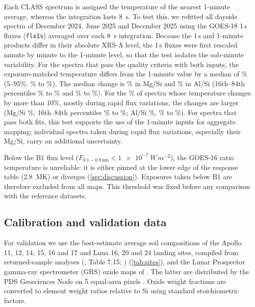 Each CLASS spectrum is assigned the temperature of the nearest 1-minute average, whereas the integration lasts \SI{8}{s}. To test this, we refitted all dayside spectra of December 2024, June 2025 and December 2025 using the GOES-18 1\,s fluxes (\texttt{flx1s}) averaged over each \SI{8}{s} integration. Because the 1\,s and 1-minute products differ in their absolute XRS-A level, the 1\,s fluxes were first rescaled minute by minute to the 1-minute level, so that the test isolates the sub-minute variability. For the \GosN{} spectra that pass the quality criteria with both inputs, the exposure-matched temperature differs from the 1-minute value by a median of \GosTMed\% (5--95\%: \GosTLo\% to \GosTHi\%). The median change is \GosMgMed\% in Mg/Si and \GosAlMed\% in Al/Si (16th--84th percentiles \GosMgLo\% to \GosMgHi\% and \GosAlLo\% to \GosAlHi\%). For the \GosBigPct\% of spectra whose temperature changes by more than 10\%, mostly during rapid flux variations, the changes are larger (Mg/Si \GosMgBigMed\%, 16th--84th percentiles \GosMgBigLo\% to \GosMgBigHi\%; Al/Si \GosAlBigMed\%, \GosAlBigLo\% to \GosAlBigHi\%). For spectra that pass both fits, this test supports the use of the 1-minute inputs for aggregate mapping; individual spectra taken during rapid flux variations, especially their Mg/Si, carry an additional uncertainty.

Below the B1 flux level ($F_{0.1-0.8\,\mathrm{nm}} < \SI{1e-7}{W\,m^{-2}}$), the GOES-16 ratio temperature is unreliable: it is either pinned at the lower edge of the response table (\SI{2.8}{MK}) or diverges (\cref{sec:discussion}). Exposures taken below B1 are therefore excluded from all maps. This threshold was fixed before any comparison with the reference datasets.

\subsection{Calibration and validation data}\label{sec:refdata}
For validation we use the best-estimate average soil compositions of the Apollo 11, 12, 14, 15, 16 and 17 and Luna 16, 20 and 24 landing sites, compiled from returned-sample analyses (\citealp{Heiken1991}, Table 7.15; \citealp{Basu1998}) (\cref{tab:sites}), and the Lunar Prospector gamma-ray spectrometer (GRS) oxide maps of \citet{Prettyman2006}. The latter are distributed by the PDS Geosciences Node on 5\textdegree{} equal-area pixels \citep{PrettymanPDS2012}. Oxide weight fractions are converted to element weight ratios relative to Si using standard stoichiometric factors.

